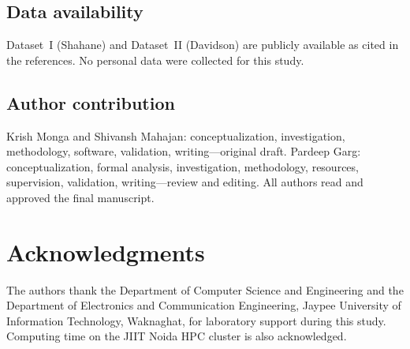 \documentclass[11pt,a4paper]{article}
\begin{document}
\subsection*{Data availability}
Dataset~I (Shahane) and Dataset~II (Davidson) are publicly available as cited in the references. No personal data were collected for this study.

\subsection*{Author contribution}
Krish Monga and Shivansh Mahajan: conceptualization, investigation, methodology, software, validation, writing---original draft. Pardeep Garg: conceptualization, formal analysis, investigation, methodology, resources, supervision, validation, writing---review and editing. All authors read and approved the final manuscript.

\section*{Acknowledgments}
The authors thank the Department of Computer Science and Engineering and the Department of Electronics and Communication Engineering, Jaypee University of Information Technology, Waknaghat, for laboratory support during this study. Computing time on the JIIT Noida HPC cluster is also acknowledged.


\end{document}
